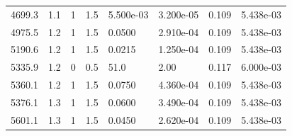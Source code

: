 \documentclass[preview]{standalone}
\begin{document}
{{\begin{tabular}{L{1.2cm}C{1.2cm} C{0.3cm}C{0.5cm} C{1.4cm}C{1.4cm} C{1.4cm}C{1.4cm}}
  4699.3  &   1.1  & 1     & 1.5 &  5.500e-03  & 3.200e-05  & 0.109 &  5.438e-03   \\ 
  4975.5  &   1.2  & 1     & 1.5 &  0.0500  & 2.910e-04  & 0.109 &  5.438e-03   \\ 
  5190.6  &   1.2  & 1     & 1.5 &  0.0215  & 1.250e-04  & 0.109 &  5.438e-03   \\ 
  5335.9  &   1.2  & 0     & 0.5 &  51.0  & 2.00  & 0.117 &  6.000e-03   \\ 
  5360.1  &   1.2  & 1     & 1.5 &  0.0750  & 4.360e-04  & 0.109 &  5.438e-03   \\ 
  5376.1  &   1.3  & 1     & 1.5 &  0.0600  & 3.490e-04  & 0.109 &  5.438e-03   \\ 
  5601.1  &   1.3  & 1     & 1.5 &  0.0450  & 2.620e-04  & 0.109 &  5.438e-03   \\ 
\hline 
\end{tabular} 

}}
\end{document}
